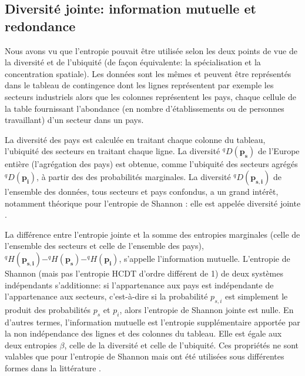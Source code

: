 \documentclass[fleqn,10pt]{ArtEcoFoG} %
\begin{document}
\subsection{Diversité jointe: information mutuelle et
redondance}\label{diversite-jointe-information-mutuelle-et-redondance}

Nous avons vu que l'entropie pouvait être utilisée selon les deux points
de vue de la diversité et de l'ubiquité (de façon équivalente: la
spécialisation et la concentration spatiale). Les données sont les mêmes
et peuvent être représentés dans le tableau de contingence dont les
lignes représentent par exemple les secteurs industriels alors que les
colonnes représentent les pays, chaque cellule de la table fournissant
l'abondance (en nombre d'établissements ou de personnes travaillant)
d'un secteur dans un pays.

La diversité des pays est calculée en traitant chaque colonne du
tableau, l'ubiquité des secteurs en traitant chaque ligne. La diversité
\(^{q}D(\mathbf{p_s})\) de l'Europe entière (l'agrégation des pays) est
obtenue, comme l'ubiquité des secteurs agrégés \(^{q}D(\mathbf{p_i})\),
à partir des des probabilités marginales. La diversité
\(^{q}D(\mathbf{p_{s,i}})\) de l'ensemble des données, tous secteurs et
pays confondus, a un grand intérêt, notamment théorique pour l'entropie
de Shannon \citep{Faddeev1956, Baez2011}: elle est appelée diversité
jointe \citep{Gregorius2010}.

La différence entre l'entropie jointe et la somme des entropies
marginales (celle de l'ensemble des secteurs et celle de l'ensemble des
pays),
\(^{q}H(\mathbf{p_{s,i}})-^{q}H(\mathbf{p_{s}})-^{q}H(\mathbf{p_{i}})\),
s'appelle l'information mutuelle. L'entropie de Shannon (mais pas
l'entropie HCDT d'ordre différent de 1) de deux systèmes indépendants
s'additionne: si l'appartenance aux pays est indépendante de
l'appartenance aux secteurs, c'est-à-dire si la probabilité \(p_{s,i}\)
est simplement le produit des probabilités \(p_{s}\) et \(p_{i}\), alors
l'entropie de Shannon jointe est nulle. En d'autres termes,
l'information mutuelle est l'entropie supplémentaire apportée par la non
indépendance des lignes et des colonnes du tableau. Elle est égale aux
deux entropies \(\beta\), celle de la diversité et celle de l'ubiquité.
Ces propriétés ne sont valables que pour l'entropie de Shannon mais ont
été utilisées sous différentes formes dans la littérature \citep[par
exemple][]{Cutrini2009, Chao2013}.
\end{document}
